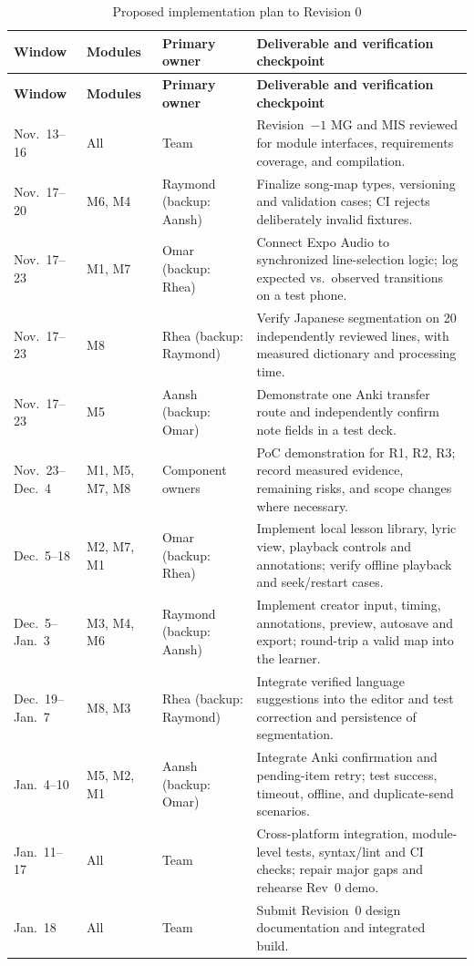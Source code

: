 \documentclass[12pt, titlepage]{article}
\begin{document}
\small
\begin{longtable}{@{}p{}p{}p{}p{}@{}}
\caption{Proposed implementation plan to Revision 0}\label{TblTimeline}\\
\toprule
\textbf{Window} & \textbf{Modules} & \textbf{Primary owner} &
\textbf{Deliverable and verification checkpoint}\\
\midrule
\endfirsthead
\toprule
\textbf{Window} & \textbf{Modules} & \textbf{Primary owner} &
\textbf{Deliverable and verification checkpoint}\\
\midrule
\endhead
\bottomrule
\endfoot
Nov.\ 13--16 & All & Team &
Revision~$-1$ MG and MIS reviewed for module interfaces,
requirements coverage, and compilation.\\
Nov.\ 17--20 & M6, M4 & Raymond (backup: Aansh) &
Finalize song-map types, versioning and validation cases;
CI rejects deliberately invalid fixtures.\\
Nov.\ 17--23 & M1, M7 & Omar (backup: Rhea) &
Connect Expo Audio to synchronized line-selection logic;
log expected vs.\ observed transitions on a test phone.\\
Nov.\ 17--23 & M8 & Rhea (backup: Raymond) &
Verify Japanese segmentation on 20 independently reviewed
lines, with measured dictionary and processing time.\\
Nov.\ 17--23 & M5 & Aansh (backup: Omar) &
Demonstrate one Anki transfer route and independently
confirm note fields in a test deck.\\
Nov.\ 23--Dec.\ 4 & M1, M5, M7, M8 & Component owners &
PoC demonstration for R1, R2, R3; record measured evidence,
remaining risks, and scope changes where necessary.\\
Dec.\ 5--18 & M2, M7, M1 & Omar (backup: Rhea) &
Implement local lesson library, lyric view, playback controls
and annotations; verify offline playback and seek/restart cases.\\
Dec.\ 5--Jan.\ 3 & M3, M4, M6 & Raymond (backup: Aansh) &
Implement creator input, timing, annotations, preview, autosave
and export; round-trip a valid map into the learner.\\
Dec.\ 19--Jan.\ 7 & M8, M3 & Rhea (backup: Raymond) &
Integrate verified language suggestions into the editor and
test correction and persistence of segmentation.\\
Jan.\ 4--10 & M5, M2, M1 & Aansh (backup: Omar) &
Integrate Anki confirmation and pending-item retry; test
success, timeout, offline, and duplicate-send scenarios.\\
Jan.\ 11--17 & All & Team &
Cross-platform integration, module-level tests, syntax/lint
and CI checks; repair major gaps and rehearse Rev~0 demo.\\
Jan.\ 18 & All & Team &
Submit Revision~0 design documentation and integrated build.\\
\end{longtable}
\normalsize
\end{document}
